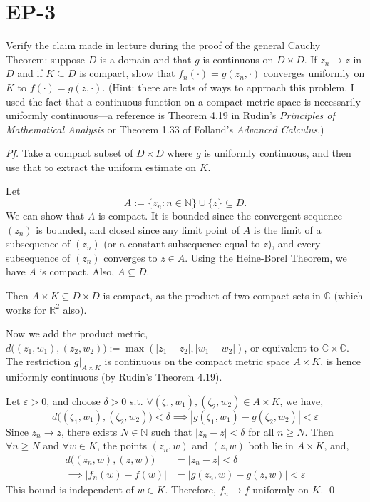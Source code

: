 \documentclass[a4paper]{article}
\begin{document}
\section*{EP-3}

\begin{tcolorbox}[colback=gray!10, colframe=black, boxrule=0.5pt, arc=2mm]
Verify the claim made in lecture during the proof of the general Cauchy Theorem: suppose $D$ is a domain and that $g$ is continuous on $D \times D$. If $z_n \to z$ in $D$ and if $K \subseteq D$ is compact, show that $f_n(\cdot) = g(z_n, \cdot)$ converges uniformly on $K$ to $f(\cdot) = g(z, \cdot)$. (Hint: there are lots of ways to approach this problem. I used the fact that a continuous function on a compact metric space is necessarily uniformly continuous---a reference is Theorem 4.19 in Rudin's \emph{Principles of Mathematical Analysis} or Theorem 1.33 of Folland's \emph{Advanced Calculus}.)
\end{tcolorbox}

\textit{Pf.} Take a compact subset of $D \times D$ where $g$ is uniformly continuous, and then use that to extract the uniform estimate on $K$. 

Let
\[
A := \{z_n : n \in \mathbb{N}\} \cup \{z\} \subseteq D.
\]
We can show that $A$ is compact. It is bounded since the convergent sequence $(z_n)$ is bounded, and closed since any limit point of $A$ is the limit of a subsequence of $(z_n)$ (or a constant subsequence equal to $z$), and every subsequence of $(z_n)$ converges to $z \in A$. Using the Heine-Borel Theorem, we have $A$ is compact. Also, $A \subseteq D$.

\medskip
Then $A \times K \subseteq D \times D$ is compact, as the product of two compact sets in $\mathbb{C}$ (which works for $\mathbb{R}^2$ also). 

Now we add the product metric, $d\big((z_1,w_1),(z_2,w_2)\big) := \max(|z_1 - z_2|, |w_1 - w_2|)$, or equivalent to $\mathbb{C} \times \mathbb{C}$. The restriction $g|_{A \times K}$ is continuous on the compact metric space $A \times K$, is hence uniformly continuous (by Rudin's Theorem 4.19).

\medskip
Let $\varepsilon > 0$, and choose $\delta > 0$ s.t. $\forall (\zeta_1, w_1), (\zeta_2, w_2) \in A \times K$, we have,
\[
d\big((\zeta_1,w_1),(\zeta_2,w_2)\big) < \delta \implies |g(\zeta_1, w_1) - g(\zeta_2, w_2)| < \varepsilon
\]
Since $z_n \to z$, there exists $N \in \mathbb{N}$ such that $|z_n - z| < \delta$ for all $n \geq N$. Then $\forall n \geq N$ and $\forall w \in K$, the points $(z_n, w)$ and $(z, w)$ both lie in $A \times K$, and,
\begin{align*}
d\big((z_n, w), (z, w)\big) &= |z_n - z| < \delta\\
\implies
|f_n(w) - f(w)| &= |g(z_n, w) - g(z, w)| < \varepsilon
\end{align*}
This bound is independent of $w \in K$. Therefore, $f_n \to f$ uniformly on $K$. \qed
\end{document}
